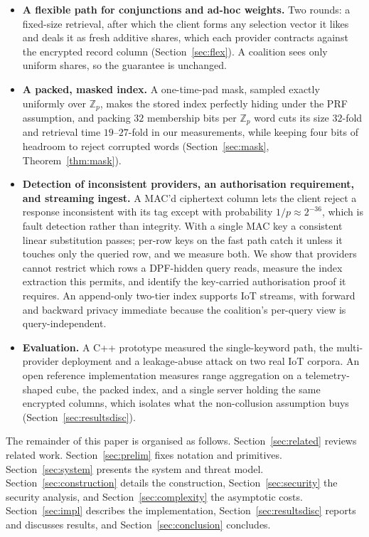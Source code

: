 \documentclass[a4paper,fleqn]{cas-sc}
\begin{document}
\begin{itemize}
\item \textbf{A flexible path for conjunctions and ad-hoc weights.} Two rounds:
a fixed-size retrieval, after which the client forms any selection vector it
likes and deals it as fresh additive shares, which each provider contracts
against the encrypted record column (Section~\ref{sec:flex}). A coalition sees
only uniform shares, so the guarantee is unchanged.

\item \textbf{A packed, masked index.} A one-time-pad mask, sampled exactly
uniformly over $\mathbb{Z}_p$, makes the stored index perfectly hiding under
the PRF assumption, and packing $32$ membership bits per $\mathbb{Z}_p$ word
cuts its size $32$-fold and retrieval time $19$--$27$-fold in our measurements,
while keeping four bits of
headroom to reject corrupted words (Section~\ref{sec:mask},
Theorem~\ref{thm:mask}).

\item \textbf{Detection of inconsistent providers, an authorisation
requirement, and streaming ingest.} A MAC'd ciphertext column lets the client
reject a response inconsistent with its tag except with probability
$1/p\approx2^{-36}$, which is fault detection rather than integrity. With a
single MAC key a consistent linear substitution passes; per-row keys on the
fast path catch it unless it touches only the queried row, and we measure
both. We show that providers cannot
restrict which rows a DPF-hidden query reads, measure the index extraction
this permits, and identify the key-carried authorisation proof it requires. An
append-only two-tier index supports IoT streams, with forward and backward
privacy immediate because the coalition's per-query view is query-independent.

\item \textbf{Evaluation.} A C++ prototype measured the single-keyword path,
the multi-provider deployment and a leakage-abuse attack on two real IoT
corpora. An open reference implementation measures range aggregation on a
telemetry-shaped cube, the packed index, and a single server holding the same
encrypted columns, which isolates what the non-collusion assumption buys
(Section~\ref{sec:resultsdisc}).
\end{itemize}

The remainder of this paper is organised as follows.
Section~\ref{sec:related} reviews related work. Section~\ref{sec:prelim} fixes
notation and primitives. Section~\ref{sec:system} presents the system and
threat model. Section~\ref{sec:construction} details
the construction, Section~\ref{sec:security} the security analysis, and
Section~\ref{sec:complexity} the asymptotic costs. Section~\ref{sec:impl}
describes the implementation, Section~\ref{sec:resultsdisc} reports and
discusses results, and Section~\ref{sec:conclusion} concludes.
\end{document}
